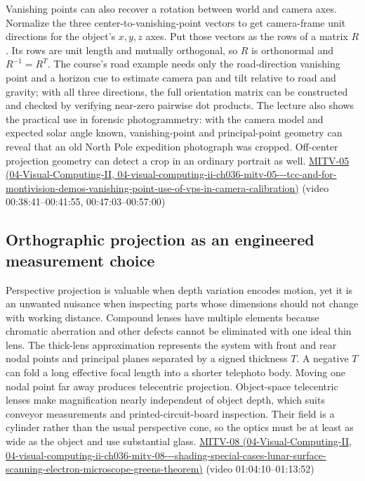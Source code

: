 Vanishing points can also recover a rotation between world and camera axes. Normalize the three center-to-vanishing-point vectors to get camera-frame unit directions for the object's \(x,y,z\) axes. Put those vectors as the rows of a matrix \(R\). Its rows are unit length and mutually orthogonal, so \(R\) is orthonormal and \(R^{-1}=R^T\). The course's road example needs only the road-direction vanishing point and a horizon cue to estimate camera pan and tilt relative to road and gravity; with all three directions, the full orientation matrix can be constructed and checked by verifying near-zero pairwise dot products. The lecture also shows the practical use in forensic photogrammetry: with the camera model and expected solar angle known, vanishing-point and principal-point geometry can reveal that an old North Pole expedition photograph was cropped. Off-center projection geometry can detect a crop in an ordinary portrait as well. \href{../04-Visual-Computing-II/main.pdf\#nameddest=04-visual-computing-ii-ch036-mitv-05---tcc-and-for-montivision-demos-vanishing-point-use-of-vps-in-camera-calibration}{MITV-05 (04-Visual-Computing-II, 04-visual-computing-ii-ch036-mitv-05-\/-\/-tcc-and-for-montivision-demos-vanishing-point-use-of-vps-in-camera-calibration)} (video 00:38:41--00:41:55, 00:47:03--00:57:00)

\subsection{Orthographic projection as an engineered measurement choice}\label{03-visual-computing-i-ch003-orthographic-projection-as-an-engineered-measurement-choice}

Perspective projection is valuable when depth variation encodes motion, yet it is an unwanted nuisance when inspecting parts whose dimensions should not change with working distance. Compound lenses have multiple elements because chromatic aberration and other defects cannot be eliminated with one ideal thin lens. The thick-lens approximation represents the system with front and rear nodal points and principal planes separated by a signed thickness \(T\). A negative \(T\) can fold a long effective focal length into a shorter telephoto body. Moving one nodal point far away produces telecentric projection. Object-space telecentric lenses make magnification nearly independent of object depth, which suits conveyor measurements and printed-circuit-board inspection. Their field is a cylinder rather than the usual perspective cone, so the optics must be at least as wide as the object and use substantial glass. \href{../04-Visual-Computing-II/main.pdf\#nameddest=04-visual-computing-ii-ch036-mitv-08---shading-special-cases-lunar-surface-scanning-electron-microscope-greens-theorem}{MITV-08 (04-Visual-Computing-II, 04-visual-computing-ii-ch036-mitv-08-\/-\/-shading-special-cases-lunar-surface-scanning-electron-microscope-greens-theorem)} (video 01:04:10--01:13:52)


